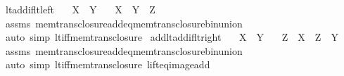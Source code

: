 \begin{isabellebody}
\isanewline
{}\isamarkupfalse%
%
\endisatagproof
{\isafoldproof}%
%
\isadelimproof
\isanewline
%
\endisadelimproof
\isanewline
{}\isamarkupfalse%
\ lt{\isacharunderscore}{\kern0pt}add{\isacharunderscore}{\kern0pt}if{\isacharunderscore}{\kern0pt}lt{\isacharunderscore}{\kern0pt}left{\isacharcolon}{\kern0pt}\isanewline
\ \ \ {\isachardoublequoteopen}X\ {\isacharless}{\kern0pt}\ Y{\isachardoublequoteclose}\isanewline
\ \ \ {\isachardoublequoteopen}X\ {\isacharless}{\kern0pt}\ Y\ {\isacharplus}{\kern0pt}\ Z{\isachardoublequoteclose}\isanewline
%
\isadelimproof
\ \ %
\endisadelimproof
%
\isatagproof
{}\isamarkupfalse%
\ assms\ mem{\isacharunderscore}{\kern0pt}trans{\isacharunderscore}{\kern0pt}closure{\isacharunderscore}{\kern0pt}add{\isacharunderscore}{\kern0pt}eq{\isacharunderscore}{\kern0pt}mem{\isacharunderscore}{\kern0pt}trans{\isacharunderscore}{\kern0pt}closure{\isacharunderscore}{\kern0pt}bin{\isacharunderscore}{\kern0pt}union\isanewline
\ \ \isamarkupfalse%
\ {\isacharparenleft}{\kern0pt}auto\ simp{\isacharcolon}{\kern0pt}\ lt{\isacharunderscore}{\kern0pt}iff{\isacharunderscore}{\kern0pt}mem{\isacharunderscore}{\kern0pt}trans{\isacharunderscore}{\kern0pt}closure{\isacharparenright}{\kern0pt}%
\endisatagproof
{\isafoldproof}%
%
\isadelimproof
\isanewline
%
\endisadelimproof
\isanewline
{}\isamarkupfalse%
\ add{\isacharunderscore}{\kern0pt}lt{\isacharunderscore}{\kern0pt}add{\isacharunderscore}{\kern0pt}if{\isacharunderscore}{\kern0pt}lt{\isacharunderscore}{\kern0pt}right{\isacharcolon}{\kern0pt}\isanewline
\ \ \ {\isachardoublequoteopen}X\ {\isacharless}{\kern0pt}\ Y{\isachardoublequoteclose}\isanewline
\ \ \ {\isachardoublequoteopen}Z\ {\isacharplus}{\kern0pt}\ X\ {\isacharless}{\kern0pt}\ Z\ {\isacharplus}{\kern0pt}\ Y{\isachardoublequoteclose}\isanewline
%
\isadelimproof
\ \ %
\endisadelimproof
%
\isatagproof
{}\isamarkupfalse%
\ assms\ mem{\isacharunderscore}{\kern0pt}trans{\isacharunderscore}{\kern0pt}closure{\isacharunderscore}{\kern0pt}add{\isacharunderscore}{\kern0pt}eq{\isacharunderscore}{\kern0pt}mem{\isacharunderscore}{\kern0pt}trans{\isacharunderscore}{\kern0pt}closure{\isacharunderscore}{\kern0pt}bin{\isacharunderscore}{\kern0pt}union\isanewline
\ \ \isamarkupfalse%
\ {\isacharparenleft}{\kern0pt}auto\ simp{\isacharcolon}{\kern0pt}\ lt{\isacharunderscore}{\kern0pt}iff{\isacharunderscore}{\kern0pt}mem{\isacharunderscore}{\kern0pt}trans{\isacharunderscore}{\kern0pt}closure\ lift{\isacharunderscore}{\kern0pt}eq{\isacharunderscore}{\kern0pt}image{\isacharunderscore}{\kern0pt}add{\isacharparenright}{\kern0pt}%

\end{isabellebody}
